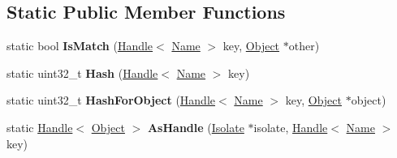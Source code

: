 \subsection*{Static Public Member Functions}
\begin{DoxyCompactItemize}
\item 
static bool {\bfseries Is\+Match} (\hyperlink{classv8_1_1internal_1_1_handle}{Handle}$<$ \hyperlink{classv8_1_1internal_1_1_name}{Name} $>$ key, \hyperlink{classv8_1_1internal_1_1_object}{Object} $\ast$other)\hypertarget{classv8_1_1internal_1_1_name_dictionary_shape_aa61a249500560f11c019f04c63b842bd}{}\label{classv8_1_1internal_1_1_name_dictionary_shape_aa61a249500560f11c019f04c63b842bd}

\item 
static uint32\+\_\+t {\bfseries Hash} (\hyperlink{classv8_1_1internal_1_1_handle}{Handle}$<$ \hyperlink{classv8_1_1internal_1_1_name}{Name} $>$ key)\hypertarget{classv8_1_1internal_1_1_name_dictionary_shape_a614cd15af545b429d62418d62018a7f1}{}\label{classv8_1_1internal_1_1_name_dictionary_shape_a614cd15af545b429d62418d62018a7f1}

\item 
static uint32\+\_\+t {\bfseries Hash\+For\+Object} (\hyperlink{classv8_1_1internal_1_1_handle}{Handle}$<$ \hyperlink{classv8_1_1internal_1_1_name}{Name} $>$ key, \hyperlink{classv8_1_1internal_1_1_object}{Object} $\ast$object)\hypertarget{classv8_1_1internal_1_1_name_dictionary_shape_ae79cffa2124466834ff91ba78d9ef754}{}\label{classv8_1_1internal_1_1_name_dictionary_shape_ae79cffa2124466834ff91ba78d9ef754}

\item 
static \hyperlink{classv8_1_1internal_1_1_handle}{Handle}$<$ \hyperlink{classv8_1_1internal_1_1_object}{Object} $>$ {\bfseries As\+Handle} (\hyperlink{classv8_1_1internal_1_1_isolate}{Isolate} $\ast$isolate, \hyperlink{classv8_1_1internal_1_1_handle}{Handle}$<$ \hyperlink{classv8_1_1internal_1_1_name}{Name} $>$ key)\hypertarget{classv8_1_1internal_1_1_name_dictionary_shape_a96d68e9a269f548351734be0ae2baf31}{}\label{classv8_1_1internal_1_1_name_dictionary_shape_a96d68e9a269f548351734be0ae2baf31}

\end{DoxyCompactItemize}
